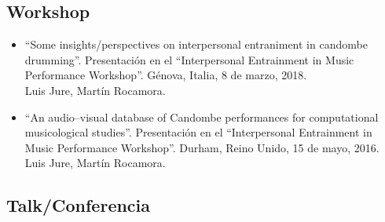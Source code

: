 \documentclass[a4paper]{article}
\begin{document}
\subsection*{Workshop}

\begin{itemize}

\item[]	%
``Some insights/perspectives on interpersonal
entraniment in candombe drumming''.
Presentación en el ``Interpersonal Entrainment in Music Performance Workshop''.
Génova, Italia, 8 de marzo, 2018.\\
Luis Jure, Martín Rocamora.

\item[]	%
``An audio--visual database of Candombe performances
for computational musicological studies''.
Presentación en el ``Interpersonal Entrainment in Music Performance Workshop''.
Durham, Reino Unido, 15 de mayo, 2016.\\
Luis Jure, Martín Rocamora.

\end{itemize}

\subsection*{Talk/Conferencia}
\end{document}
